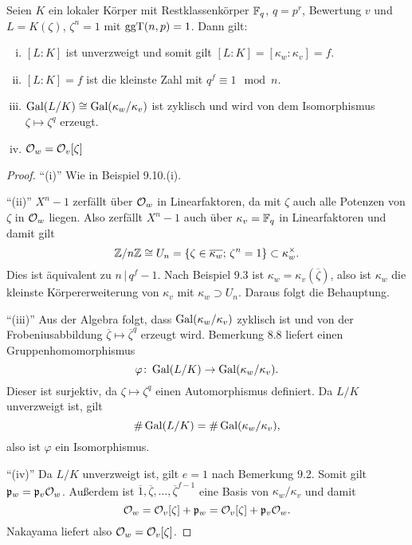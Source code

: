 \begin{Prop}
	Seien $K$ ein lokaler Körper mit Restklassenkörper $\mathbb{F}_q$, $q=p^r$, Bewertung $v$ und $L=K(\zeta)$, $\zeta^n =1$ mit $\operatorname{ggT}(n,p) = 1$. Dann gilt:
	\begin{enumerate}[(i)]
		\item $[L:K]$ ist unverzweigt und somit gilt $[L:K] = [\kappa_w:\kappa_v] =f$.
		\item $[L:K] = f$ ist die kleinste Zahl mit $q^f \equiv 1 \mod n$.
		\item $\operatorname{Gal}(L/K) \cong \operatorname{Gal}(\kappa_w/\kappa_v)$ ist zyklisch und wird von dem Isomorphismus $\zeta \mapsto \zeta^q$ erzeugt.
		\item $\mathcal{O}_w = \mathcal{O}_v[\zeta]$
	\end{enumerate}
\end{Prop}

\begin{proof}
	\enquote{(i)} Wie in Beispiel 9.10.(i).
	
	\bigskip \enquote{(ii)} $X^n-1$ zerfällt über $\mathcal{O}_w$ in Linearfaktoren, da mit $\zeta$ auch alle Potenzen von $\zeta$ in $\mathcal{O}_w$ liegen. Also zerfällt $X^n-1$ auch über $\kappa_v=\mathbb{F}_q$ in Linearfaktoren und damit gilt
	\[ \mathbb{Z} / n\mathbb{Z} \cong U_n = \left\{ 
	\zeta \in \overline{\kappa_w}; \, \zeta^n = 1
	\right\}
	\subset \kappa_w^\times.
	\]
	Dies ist äquivalent zu $n \, | \, q^f-1$. Nach Beispiel 9.3 ist $\kappa_w = \kappa_v(\overline{\zeta})$, also ist $\kappa_w$ die kleinste Körpererweiterung von $\kappa_v$ mit $\kappa_w \supset U_n$. Daraus folgt die Behauptung.
	
	\bigskip \enquote{(iii)} Aus der Algebra folgt, dass $\operatorname{Gal}(\kappa_w/\kappa_v)$ zyklisch ist und von der Frobeniusabbildung  $\overline{\zeta} \mapsto\overline{\zeta}^q$ erzeugt wird.
	Bemerkung 8.8 liefert einen Gruppenhomomorphismus
	\[ \varphi \colon \operatorname{Gal}(L/K) \to \operatorname{Gal}(\kappa_w/\kappa_v).
	\]
	Dieser ist surjektiv, da $\zeta\mapsto \zeta^q$ einen Automorphismus definiert.
	Da $L/K$ unverzweigt ist, gilt
	\[ \# \operatorname{Gal}(L/K) = \#\operatorname{Gal}(\kappa_w/\kappa_v),
	\]
	also ist $\varphi$ ein Isomorphismus.
	
	\bigskip \enquote{(iv)} Da $L/K$ unverzweigt ist, gilt $e=1$ nach Bemerkung 9.2. Somit gilt $\mathfrak{p}_w = \mathfrak{p}_v \mathcal{O}_w$.
	Außerdem ist $\overline{1}, \overline{\zeta}, \dots, \overline{\zeta}^{f-1}$ eine Basis von $\kappa_w / \kappa_v$ und damit
	\[ \mathcal{O}_w 
	= \mathcal{O}_v[\zeta] + \mathfrak{p}_w
	= \mathcal{O}_v[\zeta] + \mathfrak{p}_v\mathcal{O}_w.
	\]
	Nakayama liefert also $\mathcal{O}_w = \mathcal{O}_v[\zeta]$.
\end{proof}
